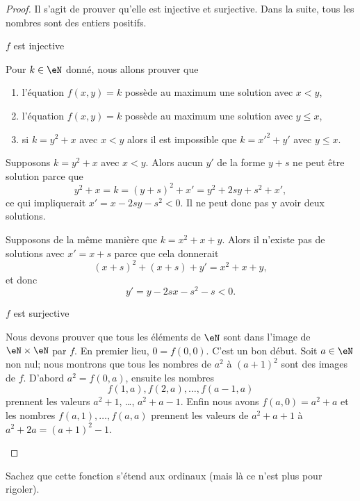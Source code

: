 \begin{proof}
    Il s'agit de prouver qu'elle est injective et surjective. Dans la suite, tous les nombres sont des entiers positifs.
    \begin{subproof}
        \item[\( f\) est injective]

            Pour \( k\in \eN\) donné, nous allons prouver que
            \begin{enumerate}
                \item
                    l'équation \( f(x,y)=k\) possède au maximum une solution avec \( x<y\),
                \item
                    l'équation \( f(x,y)=k\) possède au maximum une solution avec \( y\leq x\),
                \item
                    si \(   k=y^2+x \) avec \( x<y\) alors il est impossible que \( k=x'^2+y'\) avec \( y\leq x\).
            \end{enumerate}
            Supposons \( k=y^2+x\) avec \( x<y\). Alors aucun \( y'\) de la forme \( y+s\) ne peut être solution parce que
            \begin{equation}
                y^2+x= k=(y+s)^2+x'=y^2+2sy+s^2+x',
            \end{equation}
            ce qui impliquerait \( x'=x-2sy-s^2<0\). Il ne peut donc pas y avoir deux solutions.

            Supposons de la même manière que \( k=x^2+x+y\). Alors il n'existe pas de solutions avec \( x'=x+s\) parce que cela donnerait
            \begin{equation}
                (x+s)^2+(x+s)+y'=x^2+x+y,
            \end{equation}
            et donc
            \begin{equation}
                y'=y-2sx-s^2-s<0.
            \end{equation}

        \item[\( f\) est surjective]

            Nous devons prouver que tous les éléments de \( \eN\) sont dans l'image de \( \eN\times \eN\) par \( f\). En premier lieu, \( 0=f(0,0)\). C'est un bon début. Soit \( a\in \eN\) non nul; nous montrons que tous les nombres de \( a^2\) à \( (a+1)^2\) sont des images de \( f\). D'abord \( a^2=f(0,a)\), ensuite les nombres
            \begin{equation}
                f(1,a),f(2,a),\ldots, f(a-1,a)
            \end{equation}
            prennent les valeurs \( a^2+1\), \ldots, \( a^2+a-1\). Enfin nous avons \( f(a,0)=a^2+a\) et les nombres \( f(a,1),\ldots, f(a,a)\) prennent les valeurs de \( a^2+a+1\) à \( a^2+2a=(a+1)^2-1\).
    \end{subproof}
\end{proof}
Sachez que cette fonction s'étend aux ordinaux (mais là ce n'est plus pour rigoler).

